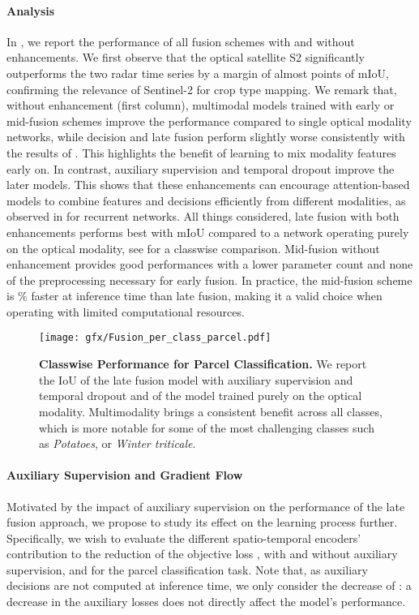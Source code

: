 \paragraph{\bf Analysis}
In , we report the performance of all fusion schemes with and without  enhancements.
We first observe that the optical satellite S2 significantly outperforms the two radar time series by a margin of almost  points of mIoU, confirming the relevance of Sentinel-2 for crop type mapping.
We remark that, without enhancement (first column), multimodal models trained with early or mid-fusion schemes improve the performance {compared to} single optical modality network{s}, {while} decision and late fusion perform slightly worse consistently with the results of \citet{pelletier2021fusion}. This highlights the benefit of learning {to mix} modality features early on. 
In contrast, auxiliary supervision and temporal dropout improve the later models. This shows that these enhancements can encourage attention-based models to combine features and decisions efficiently from different modalities, as observed in \citet{ienco2019combining} for recurrent networks. 
All things considered, late fusion with both enhancements performs best with  mIoU compared to  {a network operating purely on the optical modality}, see  for {a classwise comparison}. {Mid-}fusion without enhancement provides good performances with a lower parameter count and none of the preprocessing necessary for early fusion. In practice, the {mid-fusion scheme} is \% faster at inference time than late fusion, making it a valid choice when operating with limited computational resources.

\begin{figure}
    \centering
    \texttt{[image: gfx/Fusion\_per\_class\_parcel.pdf]}
    \caption{{\bf Classwise Performance for Parcel Classification.} We report the IoU of the late fusion model with auxiliary supervision and temporal dropout and {of} the model traine{d} purely on the optical modality. {Multimodality brings a consistent benefit across all classes, which is more notable for some of the most challenging classes such as \emph{Potatoes}, or \emph{Winter triticale}.}}
    \label{fig:perclass_parcel}
\end{figure} 
\paragraph{\bf Auxiliary Supervision and Gradient Flow}
Motivated by the impact of auxiliary supervision on the performance of the late fusion approach, we propose to study its effect on the learning process further.  
Specifically, we wish to evaluate the different spatio-temporal encoders' contribution to the reduction of the objective loss , with and without auxiliary supervision, and for the parcel classification task.
Note that, as auxiliary decisions are not computed at inference time, we only consider the decrease of : a decrease in the auxiliary losses does not directly affect the model's performance.

